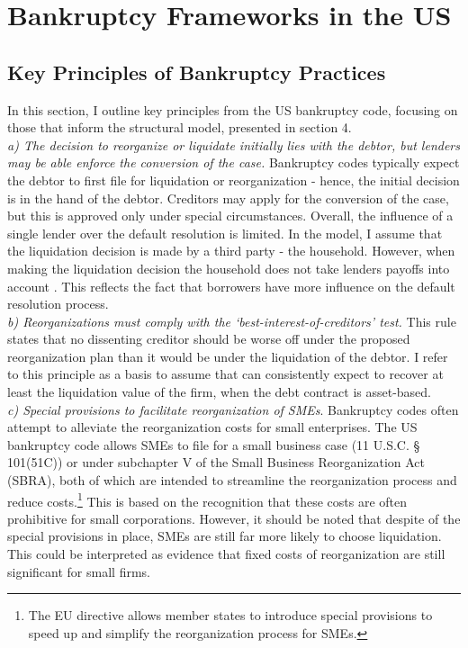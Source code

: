 \documentclass[12pt]{article}
\begin{document}
\section{Bankruptcy Frameworks in the US}
\subsection{Key Principles of Bankruptcy Practices  \label{sec:A1}}

In this section, I outline key principles from the US bankruptcy code, focusing on those that inform the structural model, presented in section 4. \vspace{3mm} \\
\textit{a) The decision to reorganize or liquidate initially lies with the debtor, but lenders may be able enforce the conversion of the case.} Bankruptcy codes typically expect the debtor to first file for liquidation or reorganization - hence, the initial decision is in the hand of the debtor. Creditors may apply for the conversion of the case, but this is approved only under special circumstances. Overall, the influence of a single lender over the default resolution is limited. In the model, I assume that the liquidation decision is made by a third party - the household. However, when making the liquidation decision the household does not take lenders payoffs into account . This reflects the fact that borrowers have more influence on the default resolution process. \vspace{3mm} \\
\textit{b) Reorganizations must comply with the `best-interest-of-creditors' test.} This rule states that no dissenting creditor should be worse off under the proposed reorganization plan than it would be under the liquidation of the debtor. I refer to this principle as a basis to assume that can consistently expect to recover at least the liquidation value of the firm, when the debt contract is asset-based. \vspace{3mm} \\
\textit{c) Special provisions to facilitate reorganization of SMEs}. Bankruptcy codes often attempt to alleviate the reorganization costs for small enterprises. The US bankruptcy code allows SMEs to file for a small business case (11 U.S.C. § 101(51C)) or under subchapter V of the Small Business Reorganization Act (SBRA), both of which are intended to streamline the reorganization process and reduce costs.\footnote{The EU directive allows member states to introduce special provisions to speed up and simplify the reorganization process for SMEs.} This is based on the recognition that these costs are often prohibitive for small corporations. However, it should be noted that despite of the special provisions in place, SMEs are still far more likely to choose liquidation. This could be interpreted as evidence that fixed costs of reorganization are still significant for small firms. 
\end{document}

